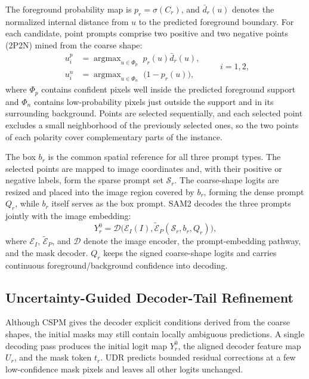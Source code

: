 \documentclass{article}
\begin{document}
\indent The foreground probability map is $p_r=\sigma(C_r)$, and $\bar d_r(u)$ denotes the normalized internal distance from $u$ to the predicted foreground boundary. For each candidate, point prompts comprise two positive and two negative points (2P2N) mined from the coarse shape:
\begin{equation}
\begin{aligned}
u^{p}_{i}&=\operatorname{argmax}_{u\in\Phi_{p}}\; p_r(u)\bar d_r(u),\\
u^{n}_{i}&=\operatorname{argmax}_{u\in\Phi_{n}}\;\bigl(1-p_r(u)\bigr),
\end{aligned}
\qquad i=1,2,
\label{eq:mining}
\end{equation}
where $\Phi_{p}$ contains confident pixels well inside the predicted foreground support and $\Phi_{n}$ contains low-probability pixels just outside the support and in its surrounding background. Points are selected sequentially, and each selected point excludes a small neighborhood of the previously selected ones, so the two points of each polarity cover complementary parts of the instance.

\indent The box $b_r$ is the common spatial reference for all three prompt types. The selected points are mapped to image coordinates and, with their positive or negative labels, form the sparse prompt set $\mathcal{S}_r$. The coarse-shape logits are resized and placed into the image region covered by $b_r$, forming the dense prompt $Q_r$, while $b_r$ itself serves as the box prompt. SAM2 decodes the three prompts jointly with the image embedding:
\begin{equation}
Y_r^0=\mathcal{D}\bigl(\mathcal{E}_I(I),
\widetilde{\mathcal{E}}_P(\mathcal{S}_r,b_r,Q_r)\bigr),
\label{eq:native-decoding}
\end{equation}
\noindent where $\mathcal{E}_I$, $\widetilde{\mathcal{E}}_P$, and $\mathcal{D}$ denote the image encoder, the prompt-embedding pathway, and the mask decoder. $Q_r$ keeps the signed coarse-shape logits and carries continuous foreground/background confidence into decoding.

\subsection{Uncertainty-Guided Decoder-Tail Refinement}
 Although CSPM gives the decoder explicit conditions derived from the coarse shapes, the initial masks may still contain locally ambiguous predictions. A single decoding pass produces the initial logit map $Y_r^0$, the aligned decoder feature map $U_r$, and the mask token $t_r$. UDR predicts bounded residual corrections at a few low-confidence mask pixels and leaves all other logits unchanged.
\end{document}
